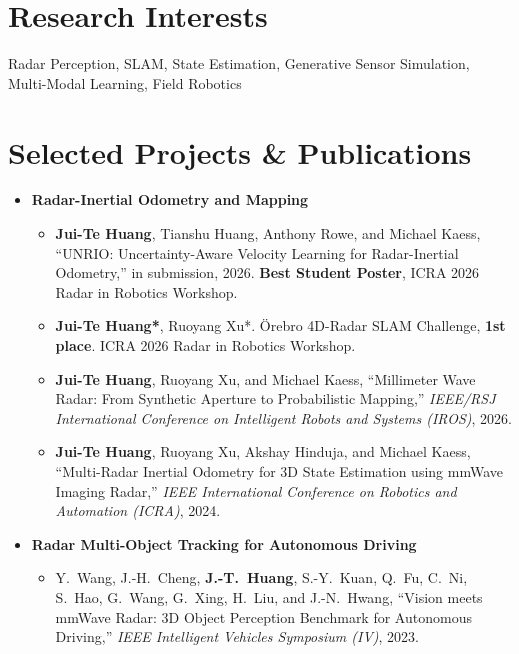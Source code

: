 \documentclass[11pt]{article}
\newcommand{\me}[1]{\textbf{#1}}
\begin{document}
\section{Research Interests}
Radar Perception, SLAM, State Estimation, Generative Sensor Simulation, Multi-Modal Learning, Field Robotics

\section{Selected Projects \& Publications}
\begin{itemize}[itemsep=4pt]
  \item \textbf{Radar-Inertial Odometry and Mapping}
  \begin{itemize}[itemsep=3pt]
    \item \me{Jui-Te Huang}, Tianshu Huang, Anthony Rowe, and Michael Kaess,
      ``UNRIO: Uncertainty-Aware Velocity Learning for Radar-Inertial Odometry,''
      in submission, 2026. \textbf{Best Student Poster}, ICRA 2026 Radar in Robotics Workshop.
    \item \me{Jui-Te Huang*}, Ruoyang Xu*.
      \"Orebro 4D-Radar SLAM Challenge, \textbf{1st place}. ICRA 2026 Radar in Robotics Workshop.
    \item \me{Jui-Te Huang}, Ruoyang Xu, and Michael Kaess,
      ``Millimeter Wave Radar: From Synthetic Aperture to Probabilistic Mapping,''
      \textit{IEEE/RSJ International Conference on Intelligent Robots and Systems (IROS)}, 2026.
    \item \me{Jui-Te Huang}, Ruoyang Xu, Akshay Hinduja, and Michael Kaess,
      ``Multi-Radar Inertial Odometry for 3D State Estimation using mmWave Imaging Radar,''
      \textit{IEEE International Conference on Robotics and Automation (ICRA)}, 2024.
  \end{itemize}

  \item \textbf{Radar Multi-Object Tracking for Autonomous Driving}
  \begin{itemize}
    \item Y.~Wang, J.-H.~Cheng, \me{J.-T.~Huang}, S.-Y.~Kuan, Q.~Fu, C.~Ni, S.~Hao, G.~Wang,
      G.~Xing, H.~Liu, and J.-N.~Hwang,
      ``Vision meets mmWave Radar: 3D Object Perception Benchmark for Autonomous Driving,''
      \textit{IEEE Intelligent Vehicles Symposium (IV)}, 2023.
  \end{itemize}


\end{itemize}
\end{document}
